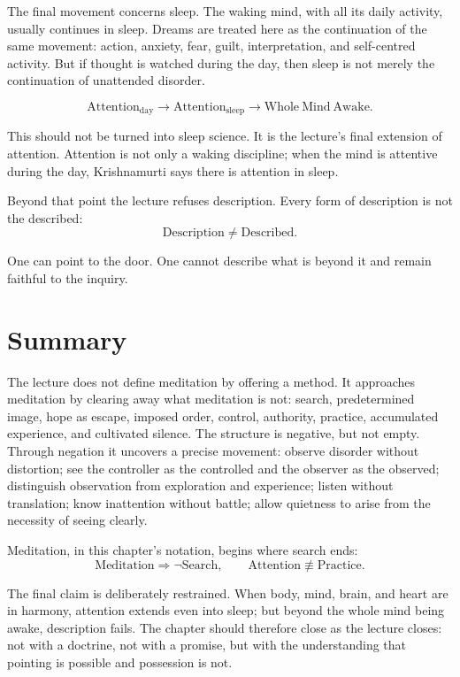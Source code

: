 The final movement concerns sleep. The waking mind, with all its daily activity, usually continues in sleep. Dreams are treated here as the continuation of the same movement: action, anxiety, fear, guilt, interpretation, and self-centred activity. But if thought is watched during the day, then sleep is not merely the continuation of unattended disorder.

\begin{equation}
\mathrm{Attention}_{\mathrm{day}}
\longrightarrow
\mathrm{Attention}_{\mathrm{sleep}}
\longrightarrow
\mathrm{Whole\ Mind\ Awake}.
\end{equation}

This should not be turned into sleep science. It is the lecture's final extension of attention. Attention is not only a waking discipline; when the mind is attentive during the day, Krishnamurti says there is attention in sleep.

Beyond that point the lecture refuses description. Every form of description is not the described:
\begin{equation}
\mathrm{Description} \neq \mathrm{Described}.
\end{equation}

One can point to the door. One cannot describe what is beyond it and remain faithful to the inquiry.

\section{Summary}

The lecture does not define meditation by offering a method. It approaches meditation by clearing away what meditation is not: search, predetermined image, hope as escape, imposed order, control, authority, practice, accumulated experience, and cultivated silence. The structure is negative, but not empty. Through negation it uncovers a precise movement: observe disorder without distortion; see the controller as the controlled and the observer as the observed; distinguish observation from exploration and experience; listen without translation; know inattention without battle; allow quietness to arise from the necessity of seeing clearly.

Meditation, in this chapter's notation, begins where search ends:
\begin{equation}
\mathrm{Meditation}
\Rightarrow
\neg \mathrm{Search},
\qquad
\mathrm{Attention}
\not\equiv
\mathrm{Practice}.
\end{equation}

The final claim is deliberately restrained. When body, mind, brain, and heart are in harmony, attention extends even into sleep; but beyond the whole mind being awake, description fails. The chapter should therefore close as the lecture closes: not with a doctrine, not with a promise, but with the understanding that pointing is possible and possession is not.